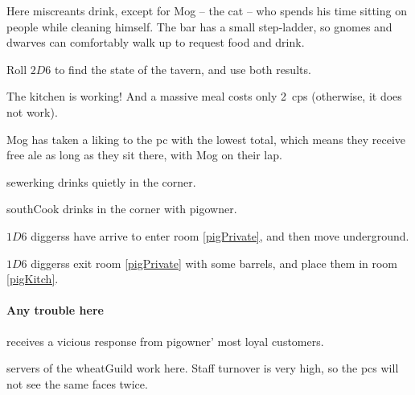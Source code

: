 \begin{multicols}{2}

Here miscreants drink, except for Mog -- the cat -- who spends his time sitting on people while cleaning himself.
The bar has a small step-ladder, so gnomes and dwarves can comfortably walk up to request food and drink.

Roll $2D6$ to find the state of the tavern, and use both results.

\begin{dlist}
  \item
  The kitchen is working!
  And a massive meal costs only 2~\glspl{cp}
  (otherwise, it does not work).
  \item
  Mog has taken a liking to the \gls{pc} with the lowest  total, which means they receive free ale as long as they sit there, with Mog on their lap.
  \item
  \Gls{sewerking} drinks quietly in the corner.
  \item
  \Gls{southCook} drinks in the corner with \gls{pigowner}.
  \item
  $1D6$ \glspl{diggers} have arrive to enter room \vref{pigPrivate}, and then move underground.
  \item
  $1D6$ \glspl{diggers} exit room \ref{pigPrivate} with some barrels, and place them in room \vref{pigKitch}.
\end{dlist}

\paragraph{Any trouble here}
receives a vicious response from \gls{pigowner}' most loyal customers.


\pigowner


\Glspl{server} of the \gls{wheatGuild} work here.
Staff turnover is very high, so the \glspl{pc} will not see the same faces twice.

\southCook


\end{multicols}
